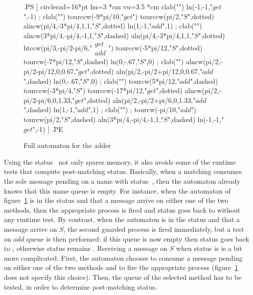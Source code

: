 \begin{figure}[th]
\begin{toimage}
.PS
[
circlerad=16*pt
hu=3 *cm
vu=3.5 *cm
clab("")
{ln(-1,-1,"$get$",-1) ; clab("")
  tourccw(-9*pi/10,"$get$")
  tourccw(pi/2,"$S$",dotted)
  {alncw(pi/4,-3*pi/4,1,1,"$S$",dotted)}
  {ln(1,-1,"$add$",1) ; clab("")
    {alncw(3*pi/4,-pi/4,-1,1,"$S$",dashed)}
    {aln(pi/4,-3*pi/4,1,1,"$S$",dotted)}
    htccw(pi/3,-pi/2-pi/6,"$\begin{array}{l} get\\ add\end{array}$")
    tourccw(-5*pi/12,"$S$",dotted)
    tourcw(-7*pi/12,"$S$",dashed)
}}
{
  ln(0,-.67,"$S$",0) ; clab("")
  {alncw(pi/2,-pi/2-pi/12,0,0.67,"$get$",dotted)}
  {aln(pi/2,-pi/2+pi/12,0,0.67,"$add$",dashed)}
  ln(0,-.67,"$S$",0) ; clab("")
  tourcw(5*pi/12,"$add$",dashed)
  tourccw(-3*pi/4,"$S$")
  tourccw(-17*pi/12,"$get$",dotted)
  {alncw(pi/2,-pi/2-pi/6,0,1.33,"$get$",dotted)}
  {aln(pi/2,-pi/2+pi/6,0,1.33,"$add$",dashed)}
}
{ln(1,-1,"$add$",1) ; clab("") ;
  tourcw(-pi/10,"$add$")
  tourcw(pi/2,"$S$",dashed)
  {aln(3*pi/4,-pi/4,-1,1,"$S$",dashed)}
  {ln(-1,-1,"$get$",-1)}}
]
.PE
\end{toimage}
\showgraph
\caption{\label{adder} Full automaton for the adder}
\end{figure}

Using the status~ not only spares memory, it also avoids
some of the runtime tests that compute post-matching status.
Basically, when a matching consumes the sole message pending on a name
with status~, then the automaton already knows that this
name queue is empty.  For instance, when the automaton of
figure~\ref{adder} is in the  status and that a message
arrive on either one of the two methods, then the appropriate process
is fired and status goes back to  without any runtime
test.  By contrast, when the automaton is in the  status
and that a message arrive on $S$, the second guarded process is fired
immediately, but a test on $add$ queue is then performed: if this
queue is now empty then status goes back to , otherwise
status remains .  Receiving a message on $S$ when status
is  is a bit more complicated. First, the automaton
chooses to consume a message pending on either one of the two methods
and to fire the appropriate process (figure~\ref{adder} does not
specify this choice).  Then, the queue of the selected method has to
be tested, in order to determine post-matching status.

